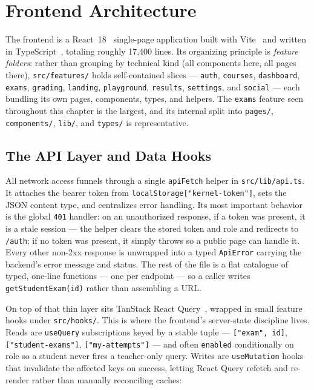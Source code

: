 \section{Frontend Architecture}

The frontend is a React~18~\cite{react} single-page application built with
Vite~\cite{vite} and written in TypeScript~\cite{typescript}, totaling roughly
17,400 lines. Its organizing principle is \emph{feature folders}: rather
than grouping by technical kind (all components here, all pages there),
\texttt{src/features/} holds self-contained slices --- \texttt{auth},
\texttt{courses}, \texttt{dashboard}, \texttt{exams}, \texttt{grading},
\texttt{landing}, \texttt{playground}, \texttt{results}, \texttt{settings}, and
\texttt{social} --- each bundling its own pages, components, types, and helpers.
The \texttt{exams} feature seen throughout this chapter is the largest, and its
internal split into \texttt{pages/}, \texttt{components/}, \texttt{lib/}, and
\texttt{types/} is representative.

\subsection{The API Layer and Data Hooks}

All network access funnels through a single \texttt{apiFetch} helper in
\texttt{src/lib/api.ts}. It attaches the bearer token from
\texttt{localStorage["kernel-token"]}, sets the JSON content type, and
centralizes error handling. Its most important behavior is the global
\texttt{401} handler: on an unauthorized response, if a token was present, it is
a stale session --- the helper clears the stored token and role and redirects to
\texttt{/auth}; if no token was present, it simply throws so a public page can
handle it. Every other non-2xx response is unwrapped into a typed
\texttt{ApiError} carrying the backend's error message and status. The rest of
the file is a flat catalogue of typed, one-line functions --- one per endpoint
--- so a caller writes \texttt{getStudentExam(id)} rather than assembling a URL.

On top of that thin layer sits TanStack React Query~\cite{reactquery}, wrapped
in small feature hooks under \texttt{src/hooks/}. This is where the frontend's
server-state discipline lives. Reads are \texttt{useQuery} subscriptions keyed
by a stable tuple --- \texttt{["exam", id]}, \texttt{["student-exams"]},
\texttt{["my-attempts"]} --- and often \texttt{enabled} conditionally on role so
a student never fires a teacher-only query. Writes are \texttt{useMutation}
hooks that invalidate the affected keys on success, letting React Query refetch
and re-render rather than manually reconciling caches:

